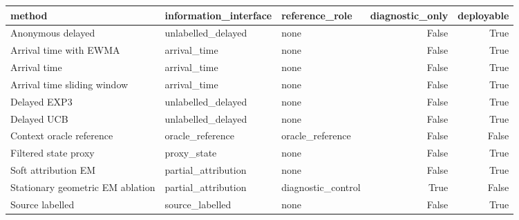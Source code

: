 \begin{tabular}{lllrr}
\toprule
method & information\_interface & reference\_role & diagnostic\_only & deployable \\
\midrule
Anonymous delayed & unlabelled\_delayed & none & False & True \\
Arrival time with EWMA & arrival\_time & none & False & True \\
Arrival time & arrival\_time & none & False & True \\
Arrival time sliding window & arrival\_time & none & False & True \\
Delayed EXP3 & unlabelled\_delayed & none & False & True \\
Delayed UCB & unlabelled\_delayed & none & False & True \\
Context oracle reference & oracle\_reference & oracle\_reference & False & False \\
Filtered state proxy & proxy\_state & none & False & True \\
Soft attribution EM & partial\_attribution & none & False & True \\
Stationary geometric EM ablation & partial\_attribution & diagnostic\_control & True & False \\
Source labelled & source\_labelled & none & False & True \\
\bottomrule
\end{tabular}
